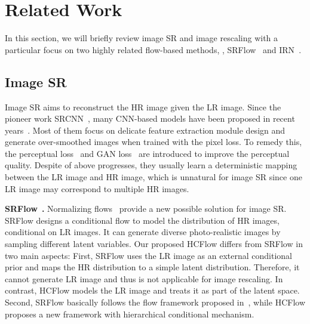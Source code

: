 \documentclass[10pt,twocolumn,letterpaper]{article}
\begin{document}
\section{Related Work}
In this section, we will briefly review image SR and image rescaling with a particular focus on two highly related flow-based methods, \ie, SRFlow~\cite{lugmayr2020srflow} and IRN~\cite{xiao2020IRN}.

\label{sec:related_work}
\subsection{Image SR}
Image SR aims to reconstruct the HR image given the LR image. Since the pioneer work SRCNN~\cite{dong2014srcnn}, many CNN-based models have been proposed in recent years~\cite{dong2014srcnn, kim2016vdsr, ledig2017SRGAN, wang2018esrgan, zhang2018rcan, zhang2018RDN, liu2020RFANet, zhang2020usrnet, liang21swinir, kai2021bsrgan, liang21manet, zhang2021DPIR}. Most of them focus on delicate feature extraction module design and generate over-smoothed images when trained with the pixel loss. To remedy this, the perceptual loss~\cite{johnson2016perceptual, wang2018esrgan} and GAN loss~\cite{goodfellow2014generative, ledig2017SRGAN, wang2018esrgan, zhang2019ranksrgan} are introduced to improve the perceptual quality. Despite of above progresses, they usually learn a deterministic mapping between the LR image and HR image, which is unnatural for image SR since one LR image may correspond to multiple HR images. 

\vspace{0.1cm}
\noindent \textbf{SRFlow}~\cite{lugmayr2020srflow}\textbf{.}
Normalizing flows~\cite{dinh2014nice, dinh2016realnvp, kingma2018glow, ho2019flow++, jaini2019polyflow, nielsen2020survae, wolf2021deflow} provide a new possible solution for image SR. SRFlow designs a conditional flow to model the distribution of HR images, conditional on LR images. It can generate diverse photo-realistic images by sampling different latent variables. Our proposed HCFlow differs from SRFlow in two main aspects: First, SRFlow uses the LR image as an external conditional prior and maps the HR distribution to a simple latent distribution. Therefore, it cannot generate LR image and thus is not applicable for image rescaling. In contrast, HCFlow models the LR image and treats it as part of the latent space. Second, SRFlow basically follows the flow framework proposed in~\cite{dinh2016realnvp}, while HCFlow proposes a new framework with hierarchical conditional mechanism.
\end{document}
